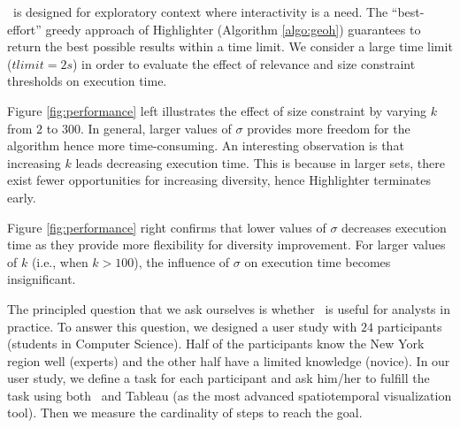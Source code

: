 

\newpage
 \framework\ is designed for exploratory context where interactivity is a need. The ``best-effort'' greedy approach of {\sc Highlighter} (Algorithm \ref{algo:geoh}) guarantees to return the best possible results within a time limit. We consider a large time limit ($tlimit = 2s$) in order to evaluate the effect of relevance and size constraint thresholds on execution time.

Figure \ref{fig:performance} left illustrates the effect of size constraint by varying $k$ from $2$ to $300$. In general, larger values of $\sigma$ provides more freedom for the algorithm hence more time-consuming. An interesting observation is that increasing $k$ leads decreasing execution time. This is because in larger sets, there exist fewer opportunities for increasing diversity, hence {\sc Highlighter} terminates early.

Figure \ref{fig:performance} right confirms that lower values of $\sigma$ decreases execution time as they provide more flexibility for diversity improvement. For larger values of $k$ (i.e., when $k >100$), the influence of $\sigma$ on execution time becomes insignificant.

\vspace{5pt}
The principled question that we ask ourselves is whether \framework\ is useful for analysts in practice. To answer this question, we designed a user study with $24$ participants (students in Computer Science). Half of the participants know the New York region well (experts) and the other half have a limited knowledge (novice). In our user study, we define a task for each participant and ask him/her to fulfill the task using both \framework\ and {\sc Tableau} (as the most advanced spatiotemporal visualization tool). Then we measure the cardinality of steps to reach the goal.

